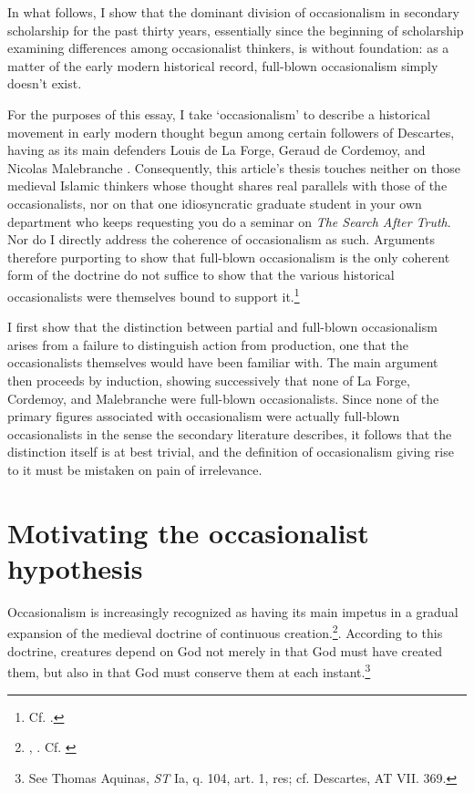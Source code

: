 In what follows, I show that the dominant division of occasionalism in secondary scholarship for the past thirty years, essentially since the beginning of scholarship examining differences among occasionalist thinkers, is without foundation: as a matter of the early modern historical record, full-blown occasionalism simply doesn't exist.

For the purposes of this essay, I take `occasionalism' to describe a historical movement in early modern thought begun among certain followers of Descartes, having as its main defenders Louis de La Forge, Geraud de Cordemoy, and Nicolas Malebranche \autocite[37]{Nadler2005}. Consequently, this article's thesis touches neither on those medieval Islamic thinkers whose thought shares real parallels with those of the occasionalists, nor on that one idiosyncratic graduate student in your own department who keeps requesting you do a seminar on \emph{The Search After Truth}. Nor do I directly address the coherence of occasionalism as such. Arguments therefore purporting to show that full-blown occasionalism is the only coherent form of the doctrine do not suffice to show that the various historical occasionalists were themselves bound to support it.\footnote{Cf. \autocite{Nadler1998,Winkler2011}.} 

I first show that the distinction between partial and full-blown occasionalism arises from a failure to distinguish action from production, one that the occasionalists themselves would have been familiar with. The main argument then proceeds by induction, showing successively that none of La Forge, Cordemoy, and Malebranche were full-blown occasionalists. Since none of the primary figures associated with occasionalism were actually full-blown occasionalists in the sense the secondary literature describes, it follows that the distinction itself is at best trivial, and the definition of occasionalism giving rise to it must be mistaken on pain of irrelevance.


\section{Motivating the occasionalist hypothesis}
Occasionalism is increasingly recognized as having its main impetus in a gradual expansion of the medieval doctrine of continuous creation.\footnote{\autocite[63]{Nadler1993b}, \autocite[219]{Nadler1998}. Cf. \autocite[287]{Winkler2011}}. According to this doctrine, creatures depend on God not merely in that God must have created them, but also in that God must conserve them at each instant.\footnote{See Thomas Aquinas, \emph{ST} Ia, q. 104, art. 1, res; cf. Descartes, AT VII. 369.} 

